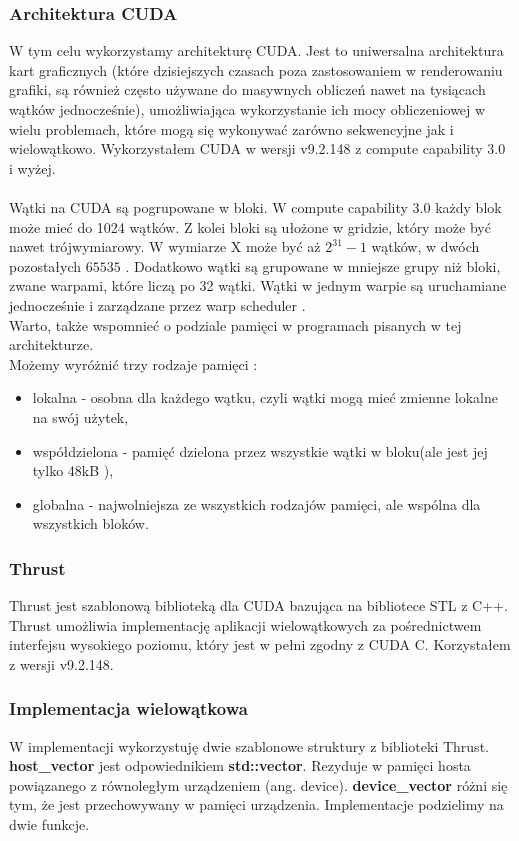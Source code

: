 \documentclass[14pt,twoside,a4paper]{article}
\theoremstyle{definition}
\begin{document}
\subsubsection{\large Architektura CUDA}
W tym celu wykorzystamy architekturę CUDA. 
Jest to uniwersalna architektura kart graficznych (które dzisiejszych czasach poza zastosowaniem w renderowaniu grafiki, są również często używane do masywnych obliczeń nawet na tysiącach wątków jednocześnie), umożliwiająca wykorzystanie ich mocy obliczeniowej w wielu problemach, które mogą się wykonywać zarówno sekwencyjne jak i wielowątkowo. Wykorzystałem CUDA w wersji v9.2.148 z compute capability 3.0 i wyżej. \\~\\
Wątki na CUDA są pogrupowane w bloki. W compute capability 3.0 każdy blok może mieć do 1024 wątków. Z kolei bloki są ułożone w gridzie, który może być nawet trójwymiarowy. W wymiarze X może być aż $2^{31}-1$ wątków, w dwóch pozostałych $65535$ \cite[str.~238-242]{Cuda}. Dodatkowo wątki są grupowane w mniejsze grupy niż bloki, zwane warpami, które liczą po 32 wątki. Wątki w jednym warpie są uruchamiane jednocześnie i zarządzane przez warp scheduler \cite[str.~70]{Cuda}.\\
\bigskip
Warto, także wspomnieć o podziale pamięci w programach pisanych w tej architekturze. \\Możemy wyróżnić trzy rodzaje pamięci :
\begin{itemize}
  \item lokalna - osobna dla każdego wątku, czyli wątki mogą mieć zmienne lokalne na swój użytek,
  \item współdzielona - pamięć dzielona przez wszystkie wątki w bloku(ale jest jej tylko 48kB \cite[str.~238-242]{Cuda}),
  \item globalna - najwolniejsza ze wszystkich rodzajów pamięci, ale wspólna dla wszystkich bloków.
\end{itemize}

\subsubsection{\large Thrust}
Thrust jest szablonową biblioteką dla CUDA bazująca na bibliotece STL z C++. Thrust umożliwia implementację aplikacji wielowątkowych za pośrednictwem interfejsu wysokiego poziomu, który jest w pełni zgodny z CUDA C. Korzystałem z wersji v9.2.148. \cite{thrust}


\subsubsection{\large Implementacja wielowątkowa}
W implementacji wykorzystuję dwie szablonowe struktury z biblioteki Thrust.
\textbf{host\_vector}\cite{thrust} jest odpowiednikiem \textbf{std::vector}. Rezyduje w pamięci hosta powiązanego z równoległym urządzeniem (ang. device). \textbf{device\_vector}\cite{thrust} różni się tym, że jest przechowywany w pamięci urządzenia. Implementacje podzielimy na dwie funkcje.\\
\bigskip
\end{document}
